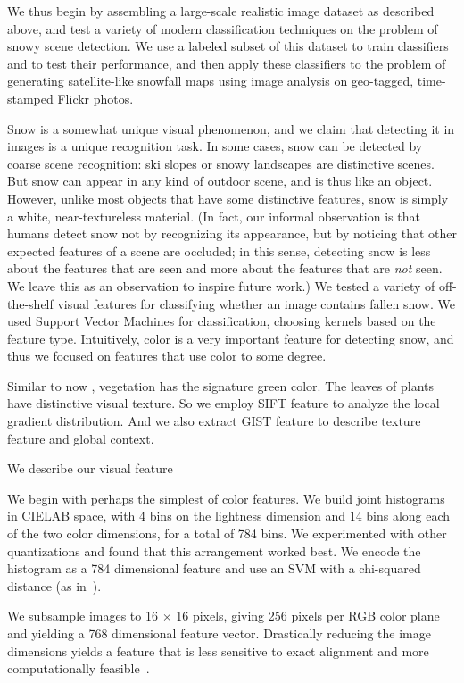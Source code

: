 We thus begin by assembling a large-scale realistic image dataset as described above, and test a variety of modern classification techniques on the
problem of snowy scene detection. We use a labeled subset of this
dataset to train classifiers and to test their performance, and then
apply these classifiers to the problem of generating satellite-like
snowfall maps using image analysis on geo-tagged, time-stamped
Flickr photos.

Snow is a somewhat unique visual phenomenon, and we claim that
detecting it in images is a unique recognition task. In some cases,
snow can be detected by coarse scene recognition: ski slopes or snowy
landscapes are distinctive scenes. But snow can appear in any kind of
outdoor scene, and is thus like an object. However, unlike most
objects that have some distinctive features, snow is simply a white,
near-textureless material.  (In fact, our informal observation is that
humans detect snow not by recognizing its appearance, but by noticing
that other expected features of a scene are occluded; in this sense,
detecting snow is less about the features that are seen and more about
the features that are \textit{not} seen. We leave this as an
observation to inspire future work.)
%
We tested a variety of off-the-shelf visual features for classifying
whether an image contains fallen snow. We used Support Vector
Machines for classification, choosing kernels based on the feature
type.  Intuitively, color is a very important feature for detecting
snow, and thus we focused on features that use color to some
degree.  

Similar to now , vegetation  has the signature green color. 
The leaves of plants have distinctive visual texture. 
So we employ SIFT feature to analyze the local gradient distribution. 
And we also extract GIST feature to describe texture feature and global context. 

We describe our visual feature 


 We begin with perhaps the simplest of color
features. We build joint histograms in CIELAB space, with 4 bins on
the lightness dimension and 14 bins along each of the two color
dimensions, for a total of 784 bins. We experimented with other
quantizations and found that this arrangement worked best.  We encode
the histogram as a 784 dimensional feature and use an SVM with a
chi-squared distance (as in~\cite{XiaoHEOT10}).

We subsample images to 16 $\times$ 16 pixels, giving 256 pixels per
RGB color plane and yielding a 768 dimensional feature vector.
Drastically reducing the image dimensions yields a feature that is
less sensitive to exact alignment and more computationally
feasible~\cite{torralba2008tiny}.  


